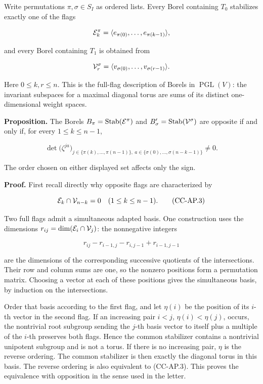 Write permutations \(\pi,\sigma\in S_I\) as ordered lists. Every Borel
containing \(T_0\) stabilizes exactly one of the flags

\[
 {\cal E}^{\pi}_k=\langle e_{\pi(0)},\ldots,e_{\pi(k-1)}\rangle ,
\]

and every Borel containing \(T_1\) is obtained from

\[
 {\cal V}^{\sigma}_r=\langle v_{\sigma(0)},\ldots,v_{\sigma(r-1)}\rangle .
\]

Here \(0\leq k,r\leq n\). This is the full-flag description of Borels in
\(\operatorname{PGL}(V)\): the invariant subspaces for a maximal
diagonal torus are sums of its distinct one-dimensional weight spaces.

\textbf{Proposition.} The Borels
\(B_\pi=\operatorname{Stab}({\cal E}^\pi)\) and
\(B'_\sigma=\operatorname{Stab}({\cal V}^\sigma)\) are opposite if and
only if, for every \(1\leq k\leq n-1\),

\[
 \det\bigl(\zeta^{ja}\bigr)_{
 j\in\{\pi(k),\ldots,\pi(n-1)\},
 \ a\in\{\sigma(0),\ldots,\sigma(n-k-1)\}}\ne0.
 \tag{CC-AP.2}
\]

The order chosen on either displayed set affects only the sign.

\textbf{Proof.} First recall directly why opposite flags are
characterized by

\[
 {\cal E}_k\cap{\cal V}_{n-k}=0
 \quad(1\leq k\leq n-1).
 \tag{CC-AP.3}
\]

Two full flags admit a simultaneous adapted basis. One construction uses
the dimensions \(r_{ij}=\dim({\cal E}_i\cap{\cal V}_j)\): the
nonnegative integers

\[
 r_{ij}-r_{i-1,j}-r_{i,j-1}+r_{i-1,j-1}
\]

are the dimensions of the corresponding successive quotients of the
intersections. Their row and column sums are one, so the nonzero
positions form a permutation matrix. Choosing a vector at each of these
positions gives the simultaneous basis, by induction on the
intersections.

Order that basis according to the first flag, and let \(\eta(i)\) be the
position of its \(i\)-th vector in the second flag. If an increasing
pair \(i<j\), \(\eta(i)<\eta(j)\), occurs, the nontrivial root subgroup
sending the \(j\)-th basis vector to itself plus a multiple of the
\(i\)-th preserves both flags. Hence the common stabilizer contains a
nontrivial unipotent subgroup and is not a torus. If there is no
increasing pair, \(\eta\) is the reverse ordering. The common stabilizer
is then exactly the diagonal torus in this basis. The reverse ordering
is also equivalent to (CC-AP.3). This proves the equivalence with
opposition in the sense used in the letter.

